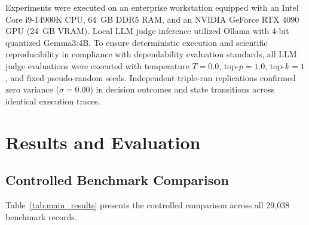 \documentclass[conference]{IEEEtran}
\begin{document}
Experiments were executed on an enterprise workstation equipped with an Intel Core i9-14900K CPU, 64~GB DDR5 RAM, and an NVIDIA GeForce RTX 4090 GPU (24~GB VRAM). Local LLM judge inference utilized Ollama with 4-bit quantized Gemma3:4B. To ensure deterministic execution and scientific reproducibility in compliance with dependability evaluation standards, all LLM judge evaluations were executed with temperature $T = 0.0$, top-$p = 1.0$, top-$k = 1$, and fixed pseudo-random seeds. Independent triple-run replications confirmed zero variance ($\sigma = 0.00$) in decision outcomes and state transitions across identical execution traces.

\section{Results and Evaluation}

\subsection{Controlled Benchmark Comparison}
Table~\ref{tab:main_results} presents the controlled comparison across all 29,038 benchmark records.

\begin{table}[t]
\caption{Controlled Comparison on the Full 29,038-Record Benchmark Dataset}
\label{tab:main_results}
\centering
{}
\end{table}
\end{document}
